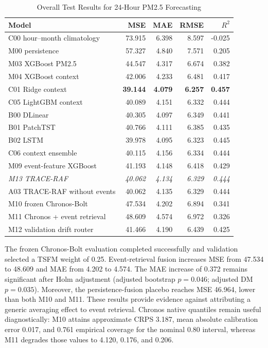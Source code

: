 \documentclass{ieeeaccess}
\begin{document}
\begin{table}[!t]
\centering
\caption{Overall Test Results for 24-Hour PM2.5 Forecasting}
\label{tab:main_results}
\begin{tabular}{lrrrr}
\toprule
Model & MSE & MAE & RMSE & $R^2$ \\
\midrule
C00 hour--month climatology & 73.915 & 6.398 & 8.597 & -0.025 \\
M00 persistence & 57.327 & 4.840 & 7.571 & 0.205 \\
M03 XGBoost PM2.5 & 44.547 & 4.317 & 6.674 & 0.382 \\
M04 XGBoost context & 42.006 & 4.233 & 6.481 & 0.417 \\
C01 Ridge context & \textbf{39.144} & \textbf{4.079} & \textbf{6.257} & \textbf{0.457} \\
C05 LightGBM context & 40.089 & 4.151 & 6.332 & 0.444 \\
B00 DLinear & 40.305 & 4.097 & 6.349 & 0.441 \\
B01 PatchTST & 40.766 & 4.111 & 6.385 & 0.435 \\
B02 LSTM & 39.978 & 4.095 & 6.323 & 0.445 \\
C06 context ensemble & 40.115 & 4.156 & 6.334 & 0.444 \\
M09 event-feature XGBoost & 41.193 & 4.148 & 6.418 & 0.429 \\
\emph{M13 TRACE-RAF} & \emph{40.062} & \emph{4.134} & \emph{6.329} & \emph{0.444} \\
A03 TRACE-RAF without events & 40.062 & 4.135 & 6.329 & 0.444 \\
M10 frozen Chronos-Bolt & 47.534 & 4.202 & 6.894 & 0.341 \\
M11 Chronos + event retrieval & 48.609 & 4.574 & 6.972 & 0.326 \\
M12 validation drift router & 41.466 & 4.190 & 6.439 & 0.425 \\
\bottomrule
\end{tabular}
\end{table}

The frozen Chronos-Bolt evaluation completed successfully and validation
selected a TSFM weight of 0.25. Event-retrieval fusion increases MSE from
47.534 to 48.609 and MAE from 4.202 to 4.574. The MAE increase of 0.372 remains
significant after Holm adjustment (adjusted bootstrap $p=0.046$; adjusted DM
$p=0.035$). Moreover, the persistence-fusion placebo reaches MSE 46.964, lower
than both M10 and M11. These results provide evidence against attributing a
generic averaging effect to event retrieval. Chronos native quantiles remain
useful diagnostically: M10 attains approximate CRPS 3.187, mean absolute
calibration error 0.017, and 0.761 empirical coverage for the nominal 0.80
interval, whereas M11 degrades those values to 4.120, 0.176, and 0.206.
\end{document}

